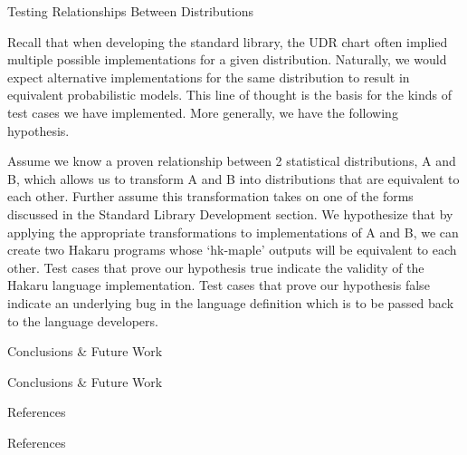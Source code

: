 \documentclass[22pt]{beamer}
\newenvironment{variableblock}[3]{%
  \setbeamercolor{block body}{#2}
  \setbeamercolor{block title}{#3}
  \begin{block}{#1}}{\end{block}}
\begin{document}
\begin{frame}[fragile]
\begin{textblock}{5}
\begin{variableblock}{}{}{}
\end{variableblock}


\begin{block}{Testing Relationships Between Distributions}
\justifying

\tiny{Recall that when developing the standard library, the UDR chart often implied multiple possible implementations for a given distribution. Naturally, we would expect alternative implementations for the same distribution to result in equivalent probabilistic models. This line of thought is the basis for the kinds of test cases we have implemented. More generally, we have the following hypothesis.}

\bigskip

\tiny{Assume we know a proven relationship between 2 statistical distributions, A and B, which allows us to transform A and B into distributions that are equivalent to each other. Further assume this transformation takes on one of the forms discussed in the Standard Library Development section. We hypothesize that by applying the appropriate transformations to implementations of A and B, we can create two Hakaru programs whose `hk-maple' outputs will be equivalent to each other. Test cases that prove our hypothesis true indicate the validity of the Hakaru language implementation. Test cases that prove our hypothesis false indicate an underlying bug in the language definition which is to be passed back to the language developers.
}

\end{block}


\begin{block}{Conclusions \& Future Work}

Conclusions \& Future Work

\end{block}


\begin{block}{References}

References

\end{block}


% 

\end{textblock}
\end{frame}
\end{document}
